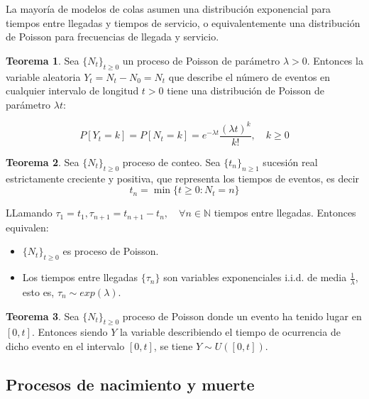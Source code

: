 \documentclass[a4paper,10pt]{scrartcl}
\theoremstyle{definition}
\newtheorem*{theorem}{Teorema}
\numberwithin{equation}{section}
\begin{document}
La mayoría de modelos de colas asumen una distribución exponencial para tiempos entre llegadas y tiempos 
de servicio, o equivalentemente una distribución de Poisson para frecuencias de llegada y servicio.

\begin{theorem}
 Sea $\{N_t\}_{t\ge 0}$ un proceso de Poisson de parámetro $\lambda > 0$. Entonces la variable aleatoria $Y_t = N_t - N_0 = N_t$ que
 describe el número de eventos en cualquier intervalo de longitud $t > 0$ tiene una distribución de Poisson de parámetro
 $\lambda t$:
 
 \[P[Y_t = k] = P[N_t = k] = e^{-\lambda t} \frac{(\lambda t)^k}{k!}, \quad k\ge 0\]
 
\end{theorem}


\begin{theorem}
 Sea $\{N_t\}_{t\ge 0}$ proceso de conteo. Sea $\{t_n\}_{n\ge 1}$ sucesión real estrictamente creciente y positiva, 
 que representa los tiempos de eventos, es decir \[t_n = \min \{t \ge 0: N_t = n\}\]
 
 LLamando $\tau_1= t_1, \tau_{n+1} = t_{n+1} - t_{n}, \quad \forall n\in \mathbb{N}$ tiempos entre llegadas. Entonces equivalen:
 
 \begin{itemize}
  \item $\{N_t\}_{t\ge 0}$ es proceso de Poisson.
  \item Los tiempos entre llegadas $\{\tau_n\}$ son variables exponenciales i.i.d. de media $\frac{1}{\lambda}$, esto es,
  $\tau_n \sim exp(\lambda)$.
 \end{itemize}

\end{theorem}


\begin{theorem}
 Sea $\{N_t\}_{t\ge 0}$ proceso de Poisson donde un evento ha tenido lugar en $[0,t]$. Entonces siendo $Y$ la variable
 describiendo el tiempo de ocurrencia de dicho evento en el intervalo $[0,t]$, se tiene $Y \sim U([0,t])$.
\end{theorem}


\subsection{Procesos de nacimiento y muerte}
\end{document}
